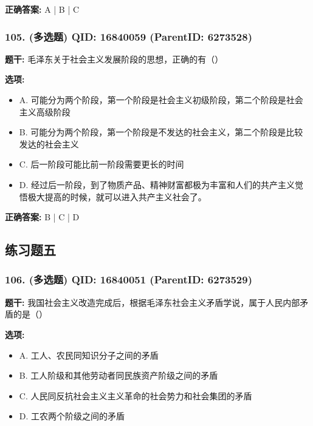 \documentclass[12pt,UTF8]{ctexart}
\begin{document}
\textbf{正确答案:}
A | B | C

\vspace{0.3em}\hrulefill\vspace{0.7em}

\subsubsection*{105. (多选题) \small QID: 16840059 (ParentID: 6273528)}

\textbf{题干:}
毛泽东关于社会主义发展阶段的思想，正确的有（）



\textbf{选项:}
\begin{itemize}[leftmargin=*]

  \item A. 可能分为两个阶段，第一个阶段是社会主义初级阶段，第二个阶段是社会主义高级阶段

  \item B. 可能分为两个阶段，第一个阶段是不发达的社会主义，第二个阶段是比较发达的社会主义

  \item C. 后一阶段可能比前一阶段需要更长的时间

  \item D. 经过后一阶段，到了物质产品、精神财富都极为丰富和人们的共产主义觉悟极大提高的时候，就可以进入共产主义社会了。

\end{itemize}

\textbf{正确答案:}
B | C | D

\vspace{0.3em}\hrulefill\vspace{0.7em}

\subsection*{练习题五}

\subsubsection*{106. (多选题) \small QID: 16840051 (ParentID: 6273529)}

\textbf{题干:}
我国社会主义改造完成后，根据毛泽东社会主义矛盾学说，属于人民内部矛盾的是（）



\textbf{选项:}
\begin{itemize}[leftmargin=*]

  \item A. 工人、农民同知识分子之间的矛盾

  \item B. 工人阶级和其他劳动者同民族资产阶级之间的矛盾

  \item C. 人民同反抗社会主义主义革命的社会势力和社会集团的矛盾

  \item D. 工农两个阶级之间的矛盾

\end{itemize}
\end{document}
